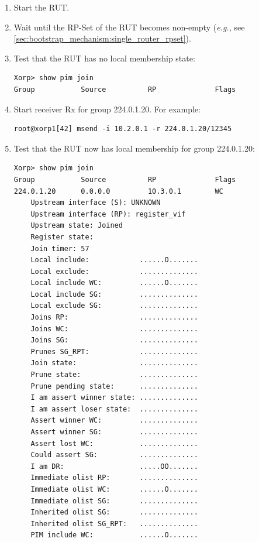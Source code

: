 \documentclass[11pt]{report}
\newcommand{\eg}{\emph{e.g.,}\xspace}
\begin{document}

\begin{enumerate}

  \item Start the RUT.

  \item Wait until the RP-Set of the RUT becomes non-empty (\eg see
        \ref{sec:bootstrap_mechanism:single_router_rpset}).

  \item Test that the RUT has no local membership state:

\begin{verbatim}
Xorp> show pim join
Group           Source          RP              Flags
\end{verbatim}

  \item Start receiver Rx for group 224.0.1.20. For example:

\begin{verbatim}
root@xorp1[42] msend -i 10.2.0.1 -r 224.0.1.20/12345
\end{verbatim}

  \item Test that the RUT now has local membership for group 224.0.1.20:

\begin{verbatim}
Xorp> show pim join
Group           Source          RP              Flags
224.0.1.20      0.0.0.0         10.3.0.1        WC
    Upstream interface (S): UNKNOWN
    Upstream interface (RP): register_vif
    Upstream state: Joined
    Register state:
    Join timer: 57
    Local include:            ......O.......
    Local exclude:            ..............
    Local include WC:         ......O.......
    Local include SG:         ..............
    Local exclude SG:         ..............
    Joins RP:                 ..............
    Joins WC:                 ..............
    Joins SG:                 ..............
    Prunes SG_RPT:            ..............
    Join state:               ..............
    Prune state:              ..............
    Prune pending state:      ..............
    I am assert winner state: ..............
    I am assert loser state:  ..............
    Assert winner WC:         ..............
    Assert winner SG:         ..............
    Assert lost WC:           ..............
    Could assert SG:          ..............
    I am DR:                  .....OO.......
    Immediate olist RP:       ..............
    Immediate olist WC:       ......O.......
    Immediate olist SG:       ..............
    Inherited olist SG:       ..............
    Inherited olist SG_RPT:   ..............
    PIM include WC:           ......O.......
\end{verbatim}


\end{enumerate}
\end{document}

